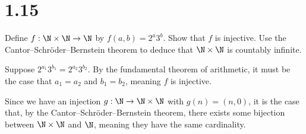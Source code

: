 \documentclass[12pt]{mypackage}
\begin{document}
\RaggedRight
\section{1.15}%
\begin{problem}
  Define $f: \N\times\N\rightarrow\N$ by $f(a,b) = 2^a3^b$. Show that $f$ is injective. Use the Cantor--Schröder--Bernstein theorem to deduce that $\N\times\N$ is countably infinite.
\end{problem}
\begin{solution}
  Suppose $2^{a_1}3^{b_1} = 2^{a_2}3^{b_2}$. By the fundamental theorem of arithmetic, it must be the case that $a_1 = a_2$ and $b_1 = b_2$, meaning $f$ is injective.\newline

  Since we have an injection $g: \N\rightarrow \N\times\N$ with $g(n) = (n,0)$, it is the case that, by the Cantor--Schröder--Bernstein theorem, there exists some bijection between $\N\times\N$ and $\N$, meaning they have the same cardinality.
\end{solution}
\end{document}
